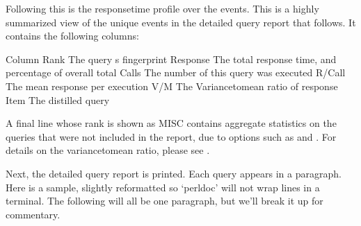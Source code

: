 \documentclass[letterpaper,10pt,english]{sphinxmanual}
\begin{document}
Following this is the response\sphinxhyphen{}time profile over the events.  This is a
highly summarized view of the unique events in the detailed query report
that follows.  It contains the following columns:

\begin{sphinxVerbatim}[commandchars=\\\{\}]
Column        
  
Rank          The query
s fingerprint
Response  The total response time, and percentage of overall total
Calls         The number of  this query was executed
R/Call        The mean response  per execution
V/M           The Variance\PYGZhy{}to\PYGZhy{}mean ratio of response 
Item          The distilled query
\end{sphinxVerbatim}

A final line whose rank is shown as MISC contains aggregate statistics on the
queries that were not included in the report, due to options such as
{\hyperref[\detokenize{mariadb-query-digest:cmdoption-mariadb-query-digest-limit}]{}} and {\hyperref[\detokenize{mariadb-query-digest:cmdoption-mariadb-query-digest-outliers}]{}}.  For details on the variance\sphinxhyphen{}to\sphinxhyphen{}mean ratio,
please see .

Next, the detailed query report is printed.  Each query appears in a paragraph.
Here is a sample, slightly reformatted so ‘perldoc’ will not wrap lines in a
terminal.  The following will all be one paragraph, but we’ll break it up for
commentary.
\end{document}
